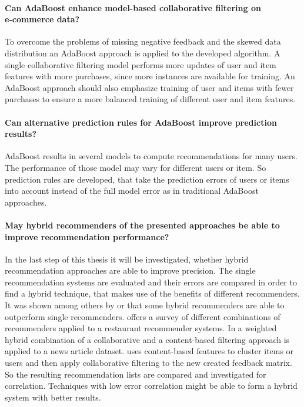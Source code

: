 \documentclass[10pt]{reportMaster}
\begin{document}
\paragraph{Can AdaBoost enhance model-based collaborative filtering on \\e-commerce data?}
To overcome the problems of missing negative feedback and the skewed data distribution an AdaBoost approach is applied to the developed algorithm.
A single collaborative filtering model performs more updates of user and item features with more purchases, since more instances are available for training.
An AdaBoost approach should also emphasize training of user and items with fewer purchases to ensure a more balanced training of different user and item features. 

\paragraph{Can alternative prediction rules for AdaBoost improve prediction results?}
AdaBoost results in several models to compute recommendations for many users.
The performance of those model may vary for different users or item.
So prediction rules are developed, that take the prediction errors of users or items into account instead of the full model error as in traditional AdaBoost approaches.

\paragraph{May hybrid recommenders of the presented approaches be able to improve recommendation performance?}
In the last step of this thesis it will be investigated, whether hybrid recommendation approaches are able to improve precision.
The single recommendation systems are evaluated and their errors are compared in order to find a hybrid technique, that makes use of the benefits of different recommenders.
It was shown among others by \cite{hybridSurvey} or \cite{hybridcfcbClaypool} that some hybrid recommenders are able to outperform single recommenders.
\cite{hybridSurvey} offers a survey of different combinations of recommenders applied to a restaurant recommender systems.
In \cite{hybridcfcbClaypool} a weighted hybrid combination of a collaborative and a content-based filtering approach is applied to a news article dataset.
\cite{hybridCFCBClustringLi} uses content-based features to cluster items or users and then apply collaborative filtering to the new created feedback matrix. %
So the resulting recommendation lists are compared and investigated for correlation.
Techniques with low error correlation might be able to form a hybrid system with better results.
\end{document}
